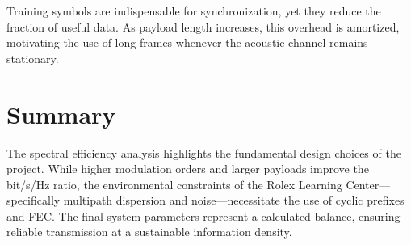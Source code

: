 \begin{Note}
    Training symbols are indispensable for synchronization, yet they reduce the fraction of useful data. As payload length increases, this overhead is amortized, motivating the use of long frames whenever the acoustic channel remains stationary.
\end{Note}

\section{Summary}

The spectral efficiency analysis highlights the fundamental design choices of the project. While higher modulation orders and larger payloads improve the bit/s/Hz ratio, the environmental constraints of the Rolex Learning Center—specifically multipath dispersion and noise—necessitate the use of cyclic prefixes and FEC. The final system parameters represent a calculated balance, ensuring reliable transmission at a sustainable information density.
